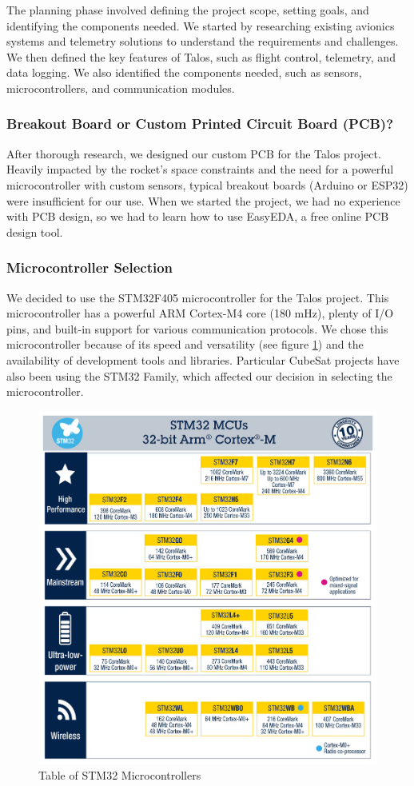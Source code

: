 \documentclass{article}
\begin{document}
The planning phase involved defining the project scope, setting goals, and identifying the components needed. We started by researching existing avionics systems and telemetry solutions to understand the requirements and challenges. We then defined the key features of Talos, such as flight control, telemetry, and data logging. We also identified the components needed, such as sensors, microcontrollers, and communication modules.
\subsubsection{Breakout Board or Custom Printed Circuit Board (PCB)?}
After thorough research, we designed our custom PCB for the Talos project. Heavily impacted by the rocket's space constraints and the need for a powerful microcontroller with custom sensors, typical breakout boards (Arduino or ESP32) were insufficient for our use. When we started the project, we had no experience with PCB design, so we had to learn how to use EasyEDA, a free online PCB design tool.
\subsubsection{Microcontroller Selection}
We decided to use the STM32F405 microcontroller for the Talos project. This microcontroller has a powerful ARM Cortex-M4 core (180 mHz), plenty of I/O pins, and built-in support for various communication protocols. We chose this microcontroller because of its speed and versatility (see figure \ref{fig:microcontrollers}) and the availability of development tools and libraries. Particular CubeSat projects have also been using the STM32 Family\cite{Yost_2023}, which affected our decision in selecting the microcontroller.
\begin{figure}[p]
      \caption{Table of STM32 Microcontrollers\cite{STM32_Table}}
      \label{fig:microcontrollers}
      \includegraphics[width=\textwidth]{stm_mcu_chart.jpg}
      \centering
\end{figure}
\end{document}

